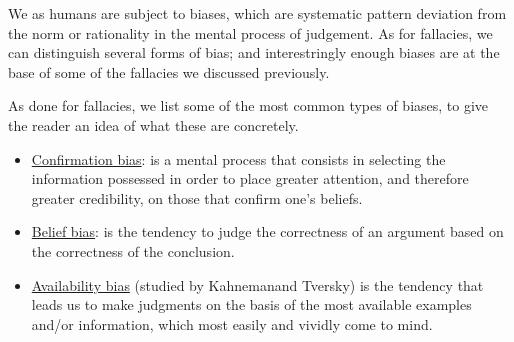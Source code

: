 \documentclass{subfiles}
\begin{document}
    We as humans are subject to biases, which are systematic pattern deviation 
        from the norm or rationality in the mental process of judgement.
        As for fallacies, we can distinguish several forms of bias; 
        and interestringly enough biases are at the base of some of the fallacies we discussed previously.

    As done for fallacies, we list some of the most common types of biases, 
        to give the reader an idea of what these are concretely.

    \begin{itemize}
        \item \underline{Confirmation bias}: is a mental process that consists in selecting
            the information possessed in order to place greater attention,
            and therefore greater credibility, on those that confirm one’s
            beliefs.

        \item \underline{Belief bias}: is the tendency to judge the correctness of an
            argument based on the correctness of the conclusion.

        \item \underline{Availability bias} (studied by Kahneman\footnotemark and Tversky) is the
            tendency that leads us to make judgments on the basis of the
            most available examples and/or information, which most easily
            and vividly come to mind.
    \end{itemize}

\end{document}
